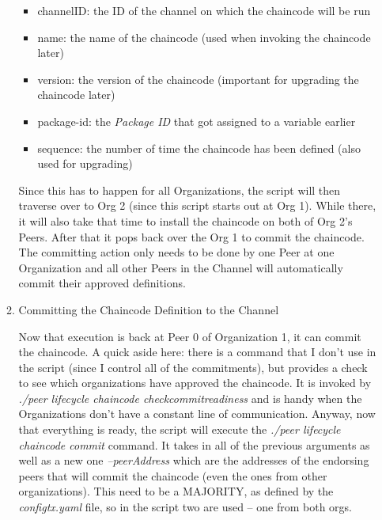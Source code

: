 \begin{itemize}
\begin{enumerate}
								\begin{itemize}
									\item channelID: the ID of the channel on which the chaincode will be run
									\item name: the name of the chaincode (used when invoking the chaincode later)
									\item version: the version of the chaincode (important for upgrading the chaincode later)
									\item package-id: the \textit{Package ID} that got assigned to a variable earlier
									\item sequence: the number of time the chaincode has been defined (also used for upgrading)
								\end{itemize}
								
							\hspace{10mm}Since this has to happen for all Organizations, the script will then traverse over to Org 2 (since this script starts out at Org 1). While there, it will also take that time to install the chaincode on both of Org 2's Peers. After that it pops back over the Org 1 to commit the chaincode. The committing action only needs to be done by one Peer at one Organization and all other Peers in the Channel will automatically commit their approved definitions.
							 
							\item Committing the Chaincode Definition to the Channel
							
								\hspace{10mm}Now that execution is back at Peer 0 of Organization 1, it can commit the chaincode. A quick aside here: there is a command that I don't use in the script (since I control all of the commitments), but provides a check to see which organizations have approved the chaincode. It is invoked by \textit{./peer lifecycle chaincode checkcommitreadiness} and is handy when the Organizations don't have a constant line of communication. Anyway, now that everything is ready, the script will execute the \textit{./peer lifecycle chaincode commit} command. It takes in all of the previous arguments as well as a new one \textit{--peerAddress} which are the addresses of the endorsing peers that will commit the chaincode (even the ones from other organizations). This need to be a MAJORITY, as defined by the \textit{configtx.yaml} file, so in the script two are used -- one from both orgs. 
								
						\end{enumerate}				
			\end{itemize}

